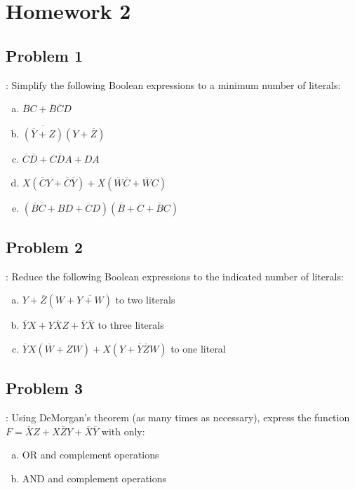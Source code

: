 \documentclass{../slides}
\begin{document}
\section{Homework 2}
\subsection{Problem 1}
\begin{frame}{\secname: \subsecname}
    Simplify the following Boolean expressions to a minimum number of literals:
    \begin{enumerate}[(a)]
        \item $\overbar{B}C + \overbar{B}\overbar{C}D$
        \item $\overbar{(\overbar{Y} + Z)}(Y + \overbar{Z})$
        \item $\overbar{C}\overbar{D} + C\overbar{D}A + DA$
        \item $X(\overbar{C}Y + \overbar{C}\overbar{Y}) + X(\overbar{W}\overbar{C} + \overbar{W}C)$
        \item $(\overbar{B}\overbar{C} + BD + \overbar{C}D)(\overbar{B} + C + \overbar{B}C)$
    \end{enumerate}
\end{frame}

\subsection{Problem 2}
\begin{frame}{\secname: \subsecname}
    Reduce the following Boolean expressions to the indicated number of literals:
    \begin{enumerate}[(a)]
        \item $Y + \overbar{Z}(W + \overbar{Y + W})$ to two literals
        \item $\overbar{Y}X + Y\overbar{X}Z + \overbar{Y}\overbar{X}$ to three literals
        \item $\overbar{Y}X(\overbar{W} + ZW) + X(Y + \overbar{Y}\overbar{Z}W)$ to one literal
    \end{enumerate}
\end{frame}

\subsection{Problem 3}
\begin{frame}{\secname: \subsecname}
    Using DeMorgan’s theorem (as many times as necessary), express the function $F = \overbar{X}Z + X\overbar{Z}Y + \overbar{X}\overbar{Y}$ with only:
    \begin{enumerate}[(a)]
        \item OR and complement operations
        \item AND and complement operations
    \end{enumerate}
\end{frame}
\end{document}
